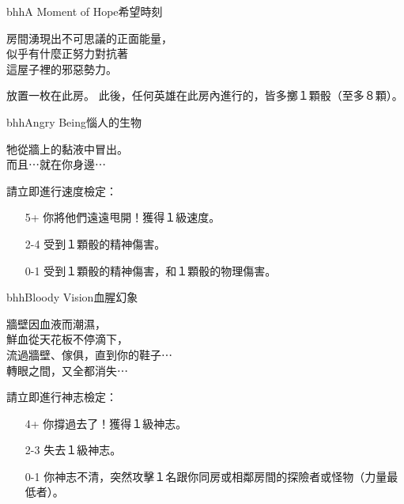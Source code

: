 
\begin{EventCard}{bhh}{A Moment of Hope}{希望時刻}
  \begin{CardStory}
    房間湧現出不可思議的正面能量，\\
    似乎有什麼正努力對抗著\\
    這屋子裡的邪惡勢力。
  \end{CardStory}
  放置一枚在此房。\smallskip
  此後，任何英雄在此房內進行的，皆多擲１顆骰（至多８顆）。\smallskip
\end{EventCard}%
\linebreak[0]%
\begin{EventCard}{bhh}{Angry Being}{惱人的生物}
  \begin{CardStory}
    牠從牆上的黏液中冒出。\\
    而且⋯就在你身邊⋯
  \end{CardStory}
  請立即進行速度檢定：
  \begin{itemize}
    \item[5+] 你將他們遠遠甩開！獲得１級速度。
    \item[2-4] 受到１顆骰的精神傷害。
    \item[0-1] 受到１顆骰的精神傷害，和１顆骰的物理傷害。
  \end{itemize}
\end{EventCard}%
\linebreak[0]%
\begin{EventCard}{bhh}{Bloody Vision}{血腥幻象}
  \begin{CardStory}
    牆壁因血液而潮濕，\\
    鮮血從天花板不停滴下，\\
    流過牆壁、傢俱，直到你的鞋子⋯\\
    轉眼之間，又全都消失⋯
  \end{CardStory}
  請立即進行神志檢定：
  \begin{itemize}
    \item[4+] 你撐過去了！獲得１級神志。
    \item[2-3] 失去１級神志。
    \item[0-1] 你神志不清，突然攻擊１名跟你同房或相鄰房間的探險者或怪物（力量最低者）。
  \end{itemize}
\end{EventCard}%
\linebreak[0]%
